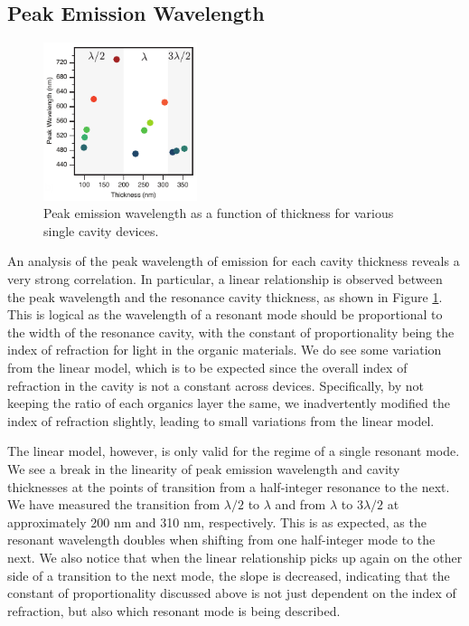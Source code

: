 \documentclass{report}
\begin{document}
        \subsection{Peak Emission Wavelength} \label{peakWavelength}
            \begin{figure}
                \centering
                \includegraphics[width=0.4\textwidth]{images/n1_peak_emission.png}
                \caption{\small Peak emission wavelength as a function of thickness for various single cavity devices.}
                \label{fig:peak_emission}
            \end{figure}

            An analysis of the peak wavelength of emission for each cavity thickness reveals a very strong correlation. In particular, a linear relationship is observed between the peak wavelength and the resonance cavity thickness, as shown in Figure \ref{fig:peak_emission}. This is logical as the wavelength of a resonant mode should be proportional to the width of the resonance cavity, with the constant of proportionality being the index of refraction for light in the organic materials. We do see some variation from the linear model, which is to be expected since the overall index of refraction in the cavity is not a constant across devices. Specifically, by not keeping the ratio of each organics layer the same, we inadvertently modified the index of refraction slightly, leading to small variations from the linear model.
            
            The linear model, however, is only valid for the regime of a single resonant mode. We see a break in the linearity of peak emission wavelength and cavity thicknesses at the points of transition from a half-integer resonance to the next. We have measured the transition from $\lambda/2$ to $\lambda$ and from $\lambda$ to $3\lambda/2$ at approximately 200 nm and 310 nm, respectively. This is as expected, as the resonant wavelength doubles when shifting from one half-integer mode to the next. We also notice that when the linear relationship picks up again on the other side of a transition to the next mode, the slope is decreased, indicating that the constant of proportionality discussed above is not just dependent on the index of refraction, but also which resonant mode is being described.
        
\end{document}
